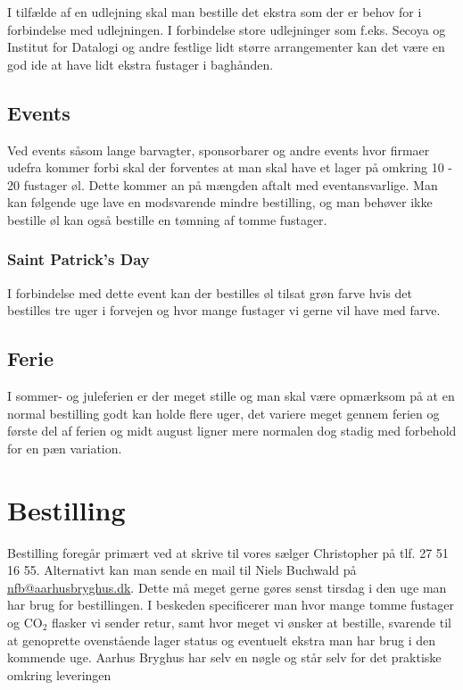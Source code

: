 I tilfælde af en udlejning skal man bestille det ekstra som der er behov for i forbindelse med
udlejningen. I forbindelse store udlejninger som f.eks. Secoya og Institut for Datalogi og andre
festlige lidt større arrangementer  kan det være en god ide at have lidt ekstra fustager i baghånden.

\subsection{Events}

Ved events såsom lange barvagter, sponsorbarer og andre events hvor firmaer udefra kommer forbi skal der forventes
at man skal have et lager på omkring 10 - 20 fustager øl. Dette kommer an på mængden aftalt med eventansvarlige. Man kan følgende uge lave en modsvarende mindre bestilling,
og man behøver ikke bestille øl kan også bestille en tømning af tomme fustager.

\subsubsection{Saint Patrick's Day}

I forbindelse med dette event kan der bestilles øl tilsat grøn farve hvis det bestilles tre uger i forvejen og hvor mange
fustager vi gerne vil have med farve.

\subsection{Ferie}

I sommer- og juleferien er der meget stille og man skal være opmærksom på at en normal bestilling
godt kan holde flere uger, det variere meget gennem ferien og første del af ferien og
midt august ligner mere normalen dog stadig med forbehold for en pæn variation.


\section{Bestilling}

Bestilling foregår primært ved at skrive til vores sælger Christopher på tlf. 27 51 16 55. Alternativt kan man sende en mail til Niels Buchwald på \\
\href{mailto:nfb@aarhusbryghus.dk}{nfb@aarhusbryghus.dk}. Dette må meget gerne gøres senst tirsdag i den uge man har brug for bestillingen.
I beskeden specificerer man hvor mange tomme fustager og CO$_{2}$ flasker vi sender retur, samt hvor meget vi ønsker at bestille,
svarende til at genoprette ovenstående lager status og eventuelt ekstra man har brug i den kommende uge.
Aarhus Bryghus har selv en nøgle og står selv for det praktiske omkring leveringen


